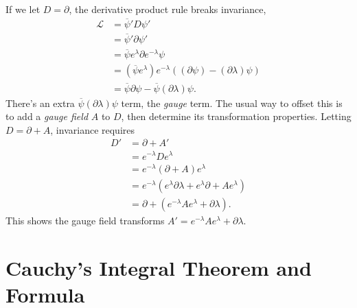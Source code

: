	If we let $D = \partial$, the derivative product rule breaks invariance,	
	\begin{align*}
	\mathcal{L} &= \overline{\psi}' D \psi' \\
	&= \overline{\psi}' \partial \psi' \\
	&= \overline{\psi}e^{\lambda} \partial e^{-\lambda}\psi \\
	&= \left(\overline{\psi}e^{\lambda}\right) e^{-\lambda}\left(\left(\partial\psi\right) - \left(\partial\lambda\right)\psi\right) \\
	&= \overline{\psi}\partial\psi - \overline{\psi}\left(\partial\lambda\right)\psi.
	\end{align*} 	
	There's an extra $\overline{\psi}\left(\partial\lambda\right)\psi$ term, the \emph{gauge} term. The usual way to offset this is to add a \emph{gauge field} $A$ to $D$, then determine its transformation properties. Letting $D = \partial + A$, invariance requires	
	\begin{align*}
	D' &= \partial + A' \\
	&= e^{-\lambda}De^{\lambda}\\
	&=e^{-\lambda}\left(\partial + A\right)e^{\lambda} \\
	&= e^{-\lambda}\left(e^{\lambda}\partial\lambda + e^{\lambda}\partial + Ae^{\lambda}\right)\\
	&= \partial + \left(e^{-\lambda}Ae^{\lambda}+\partial\lambda\right).
	\end{align*}	
	This shows the gauge field transforms $A' = e^{-\lambda}Ae^{\lambda}+\partial\lambda.$
	
	
	\section{Cauchy's Integral Theorem and Formula}
	
	